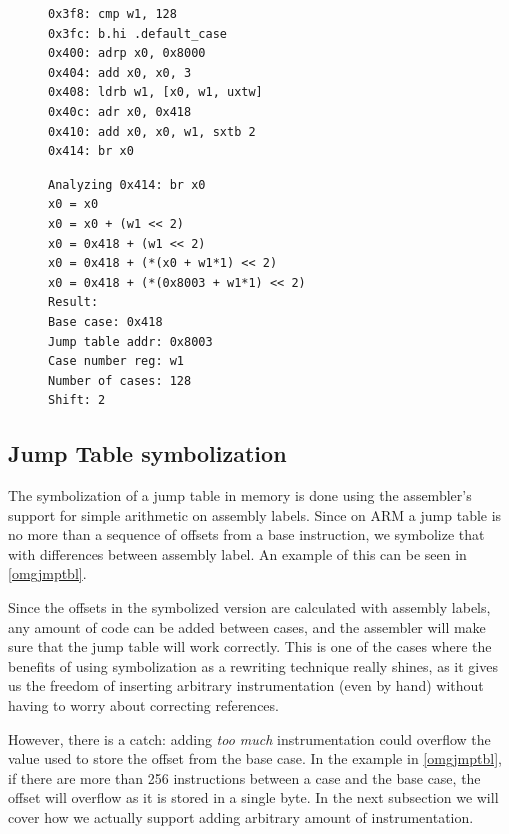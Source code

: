 \documentclass[a4paper,11pt,oneside]{report}
\begin{document}
\begin{figure}[h]
\begin{lstlisting}[basicstyle=\ttfamily\small,numbers=none]
0x3f8: cmp w1, 128
0x3fc: b.hi .default_case
0x400: adrp x0, 0x8000
0x404: add x0, x0, 3
0x408: ldrb w1, [x0, w1, uxtw]
0x40c: adr x0, 0x418
0x410: add x0, x0, w1, sxtb 2
0x414: br x0
\end{lstlisting}
\begin{lstlisting}[basicstyle=\ttfamily\small,numbers=none]
Analyzing 0x414: br x0
x0 = x0
x0 = x0 + (w1 << 2)
x0 = 0x418 + (w1 << 2)
x0 = 0x418 + (*(x0 + w1*1) << 2)
x0 = 0x418 + (*(0x8003 + w1*1) << 2)
Result:
Base case: 0x418
Jump table addr: 0x8003
Case number reg: w1
Number of cases: 128
Shift: 2
\end{lstlisting}
\label{emulator}
\end{figure}


\subsection{Jump Table symbolization}

The symbolization of a jump table in memory is done using the assembler's 
support for simple arithmetic on assembly labels. Since on ARM a jump table
is no more than a sequence of offsets from a base instruction, we symbolize
that with differences between assembly label. An example of this can be seen
in \autoref{omgjmptbl}.

Since the offsets in the symbolized version are calculated with assembly labels,
any amount of code can be added between cases, and the assembler will make sure
that the jump table will work correctly. This is one of the cases where the benefits
of using symbolization as a rewriting technique really shines, as it gives us the 
freedom of inserting arbitrary instrumentation (even by hand) without having to worry
about correcting references.

However, there is a catch: adding \emph{too much} instrumentation could
overflow the value used to store the offset from the base case. In the example
in \autoref{omgjmptbl}, if there are more than 256 instructions between a case
and the base case, the offset will overflow as it is stored in a single byte.
In the next subsection we will cover how we actually support adding arbitrary
amount of instrumentation. 
\end{document}
